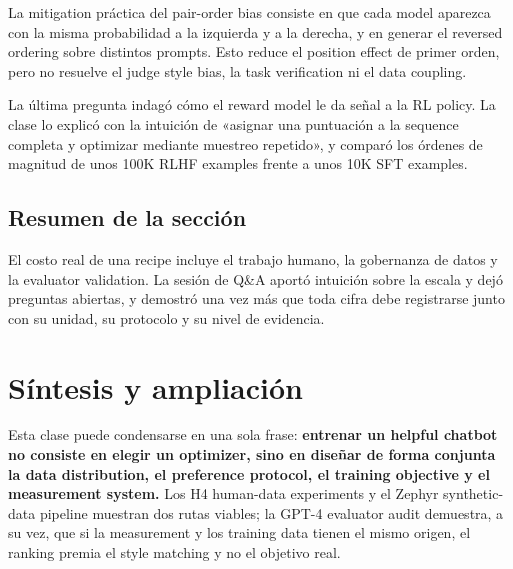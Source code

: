 \documentclass[a4paper]{article}
\begin{document}

La mitigation práctica del pair-order bias consiste en que cada model aparezca con la misma probabilidad a la izquierda y a la derecha, y en generar el reversed ordering sobre distintos prompts. Esto reduce el position effect de primer orden, pero no resuelve el judge style bias, la task verification ni el data coupling.


La última pregunta indagó cómo el reward model le da señal a la RL policy. La clase lo explicó con la intuición de «asignar una puntuación a la sequence completa y optimizar mediante muestreo repetido», y comparó los órdenes de magnitud de unos 100K RLHF examples frente a unos 10K SFT examples.


\subsection{Resumen de la sección}

El costo real de una recipe incluye el trabajo humano, la gobernanza de datos y la evaluator validation. La sesión de Q\&A aportó intuición sobre la escala y dejó preguntas abiertas, y demostró una vez más que toda cifra debe registrarse junto con su unidad, su protocolo y su nivel de evidencia.
\section{Síntesis y ampliación}

Esta clase puede condensarse en una sola frase: \textbf{entrenar un helpful chatbot no consiste en elegir un optimizer, sino en diseñar de forma conjunta la data distribution, el preference protocol, el training objective y el measurement system.} Los H4 human-data experiments y el Zephyr synthetic-data pipeline muestran dos rutas viables; la GPT-4 evaluator audit demuestra, a su vez, que si la measurement y los training data tienen el mismo origen, el ranking premia el style matching y no el objetivo real.
\end{document}
